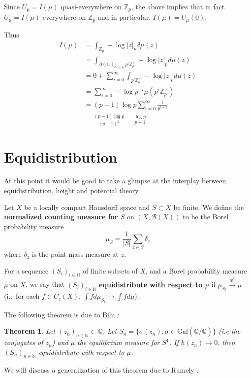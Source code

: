 \documentclass{amsart}
\newtheorem{thm}{Theorem}[section]
\newcommand{\N}{\mathbb{N}}
\newcommand{\Z}{\mathbb{Z}}
\newcommand{\Q}{\mathbb{Q}}
\newcommand{\MCB}{\mathcal{B}}
\newcommand{\ol}{\overline}
\begin{document}
Since $U_{\mu} = I(\mu)$ quasi-everywhere on $\Z_p$, the above implies that in fact $U_{\mu} = I(\mu)$ everywhere on $\Z_p$ and in particular, $I(\mu) = U_{\mu}(0)$.

Thus 
\begin{align*}
I(\mu) 
&= \int_{\Z_p}-\log|z|_pd\mu(z)\\
&= \int_{\{0\}\cup \bigcup\limits_{i \in \N}p^i\Z_p^{\times}}-\log|z|_pd\mu(z)\\
&= 0+ \sum_{i=0}^{\infty} \int_{p^i\Z_p^{\times}}-\log|z|_p d\mu(z)\\
&= \sum_{i=0}^{\infty}-\log p^{-i} \mu(p^i\Z_p^{\times})\\
&= (p-1)\log p \sum_{i=0}^{\infty}\frac{i}{p^{i+1}}\\
&= \frac{(p-1)  \log p}{(p-1)^2} = \frac{\log p}{p-1} 
\end{align*}  

\section{Equidistribution}

At this point it would be good to take a glimpse at the interplay between equidistribution, height and potential theory. 

Let $X$ be a locally compact Hausdorff space and $S \subset X $ be finite. We define the \textbf{normalized counting measure for $S$} on $(X, \MCB(X))$ to be the Borel probability measure $$\mu_S = \frac{1}{|S|}\sum\limits_{z \in S} \delta_z$$ where $\delta_z$ is the point mass measure at $z$. \

For a sequence $(S_i)_{i \in \N}$ of finite subsets of $X$, and a Borel probability measure $\mu$ on $X$, we say that $(S_i)_{i \in \N}$   \textbf{equidistribute with respect to $\mu$} if $\mu_{S_i} \xrightarrow{w^*} \mu$ (i.e for each $f \in C_c(X)$, $\int f d\mu_{S_i} \rightarrow \int f d\mu$).

The following theorem is due to Bilu \cite{Bilu}:

\begin{thm}

Let $(z_n)_{n \in \N} \subset \overline{\Q}$. Let $S_n = \{\sigma(z_n): \sigma \in \mathrm{Gal}(\ol{ \Q }/ \Q )\}$ (i.e the conjugates of $z_n$) and $\mu$ the equilibrium measure for $S^1$. If $h(z_n) \rightarrow 0$, then $(S_n)_{n \in \N}$ equidistribute with respect to $\mu$.  

\end{thm}
 
We will discuss a generalization of this theorem due to Rumely \cite{R}. 
\end{document}
